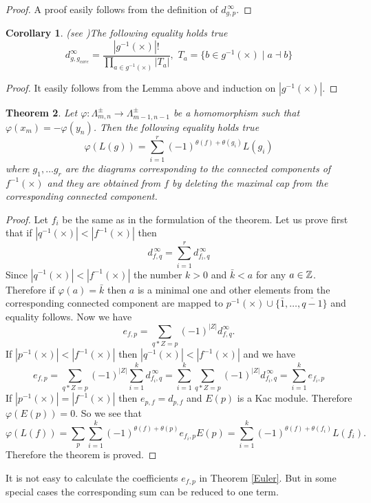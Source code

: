 \documentclass[12pt,reqno]{amsart}
\newtheorem{thm}{Theorem}[section]
\newtheorem{corollary}[thm]{Corollary}
\begin{document}
\begin{proof} A proof  easily follows from the definition of $d^{\,\infty}_{g,p}$.
\end{proof}
\begin{corollary}  (see \cite {HW})The following equality holds true 
$$
d^{\infty}_{g,g_{core}}=\frac{|g^{-1}(\times)|!}{\prod_{a\in g^{-1}(\times)}|T_a |},\,\, T_a=\{b\in g^{-1}(\times)\mid a\dashv b \}
$$

\end{corollary}
\begin{proof} It easily follows from the Lemma above and induction on $|g^{-1}(\times)|$.
\end{proof}
\begin{thm}  Let $\varphi : \Lambda^{\pm}_{m,n}\rightarrow \Lambda^{\pm}_{m-1,n-1} $ be a homomorphism  such that $\varphi(x_m)=-\varphi(y_n)$.
Then the following equality holds true
$$
\varphi(L(g))=\sum_{i=1}^r(-1)^{\theta(f)+\theta( g_i)}L(g_i)
$$
where $g_1,\dots g_r$ are the diagrams corresponding to  the connected components of $f^{-1}(\times)$  and  they  are obtained from $f$ by deleting the maximal  cap from the corresponding connected component.
\end{thm}
\begin{proof} Let $f_i$ be the same as in the formulation of the theorem.   Let us prove first that  if $|q^{-1}(\times)|<|f^{-1}(\times)|$ then
$$
d^{\,\infty}_{f,q}=\sum_{i=1}^rd^{\,\infty}_{f_i,q}
$$
Since $|q^{-1}(\times)|<|f^{-1}(\times)|$ the number $k>0$ and $\bar k<a$ for any $a\in\Bbb Z$. Therefore if $\varphi(a)=\bar k$ then $a$ is a minimal one  and other elements from the corresponding connected component are mapped  to $p^{-1}(\times)\cup\{\bar1,\dots,\overline{q-1}\}$ and equality  follows. Now we have  
$$
e_{f,p}=\sum_{q*Z=p}(-1)^{|Z|}d^{\infty}_{f,q}.
$$
If  $|p^{-1}(\times)|<|f^{-1}(\times)|$ then $|q^{-1}(\times)|<|f^{-1}(\times)|$  and we have 
$$
e_{f,p}=\sum_{q*Z=p}(-1)^{|Z|}\sum_{i=1}^kd^{\,\infty}_{f_i,q}=\sum_{i=1}^k\sum_{q*Z=p}(-1)^{|Z|}d^{\,\infty}_{f_i,q}=\sum_{i=1}^ke_{f_i,p}
$$
If  $|p^{-1}(\times)|=|f^{-1}(\times)|$ then $e_{p,f}=d_{p,f}$ and $E(p)$ is a Kac module. Therefore $\varphi(E(p))=0$. So we see that
$$
\varphi(L(f))=\sum_{p}\sum_{i=1}^k(-1)^{\theta(f)+\theta(p)}e_{f_i,p}E(p)=\sum_{i=1}^k(-1)^{\theta(f)+\theta(f_i)}L(f_i).
$$
Therefore the theorem is proved.
\end{proof}
 It is not easy to calculate the  coefficients   $e_{f,p}$ in Theorem \ref{Euler}. But in some special  cases the corresponding sum can be reduced to one term. 
\end{document}

